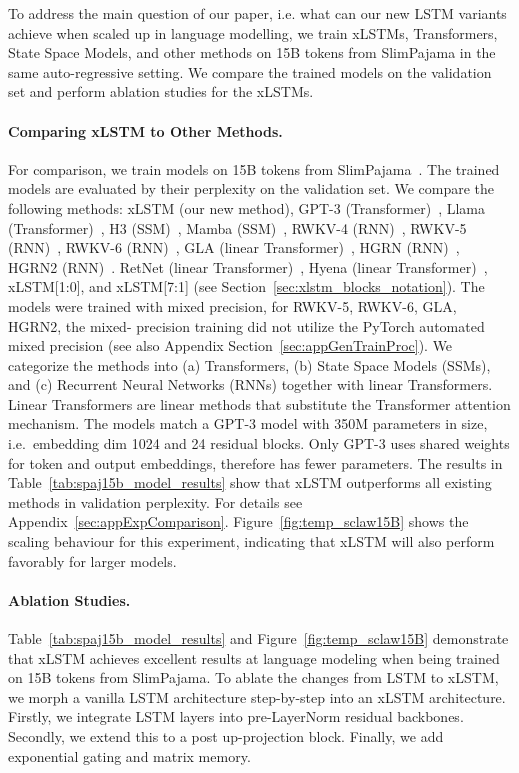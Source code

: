 To address the main question of our paper, i.e. what can our new LSTM variants achieve when scaled up in language modelling, we train xLSTMs, Transformers, State Space Models, and other methods on 15B tokens from SlimPajama in the same auto-regressive setting. We compare the trained models on the validation set and perform ablation studies for the xLSTMs.

\paragraph{Comparing xLSTM to Other Methods.} For comparison, we train models on 15B tokens from SlimPajama~\citep{Soboleva:23}. The trained models are evaluated by their perplexity on the validation set. We compare the following methods: xLSTM (our new method), GPT-3 (Transformer)~\citep{Brown:20short}, Llama (Transformer)~\citep{Touvron:23arxiv}, H3 (SSM)~\citep{Fu:23}, Mamba (SSM)~\citep{Gu:24arxiv}, RWKV-4 (RNN)~\citep{Peng:23arxivshort}, RWKV-5 (RNN)~\citep{Peng:24arxivshort}, RWKV-6 (RNN)~\citep{Peng:24arxivshort}, GLA (linear Transformer)~\citep{Yang:23arxiv}, HGRN (RNN)~\citep{Qin:23}, HGRN2 (RNN)~\citep{Qin:24arxiv}. RetNet (linear Transformer)~\citep{Sun:23arxiv}, Hyena (linear Transformer)~\citep{Poli:23}, xLSTM[1:0], and xLSTM[7:1] (see Section~\ref{sec:xlstm_blocks_notation}). 
The models were trained with mixed precision, for RWKV-5, RWKV-6, GLA, HGRN2, the mixed- precision training did not utilize the PyTorch automated mixed precision (see also Appendix Section~\ref{sec:appGenTrainProc}).
We categorize the methods into (a) Transformers, (b) State Space Models (SSMs), and (c) Recurrent Neural Networks (RNNs) together with linear Transformers. Linear Transformers are linear methods that substitute the Transformer attention mechanism. The models match a GPT-3 model with 350M parameters in size,
i.e.\ embedding dim 1024 and 24 residual blocks. Only GPT-3 uses shared weights for token and output embeddings, therefore has fewer parameters. The results in Table~\ref{tab:spaj15b_model_results} show that xLSTM outperforms all existing methods in validation perplexity. For details see Appendix~\ref{sec:appExpComparison}.
Figure~\ref{fig:temp_sclaw15B} shows the scaling behaviour for this experiment, indicating that xLSTM will also perform favorably for larger models.

\paragraph{Ablation Studies.}
Table~\ref{tab:spaj15b_model_results} and Figure~\ref{fig:temp_sclaw15B} demonstrate that xLSTM achieves excellent results at language modeling when being trained on 15B tokens from SlimPajama. To ablate the changes from LSTM to xLSTM, we morph a vanilla LSTM architecture step-by-step into an xLSTM architecture. Firstly, we integrate LSTM layers into pre-LayerNorm residual backbones. Secondly, we extend this to a post up-projection block. Finally, we add exponential gating and matrix memory. 


